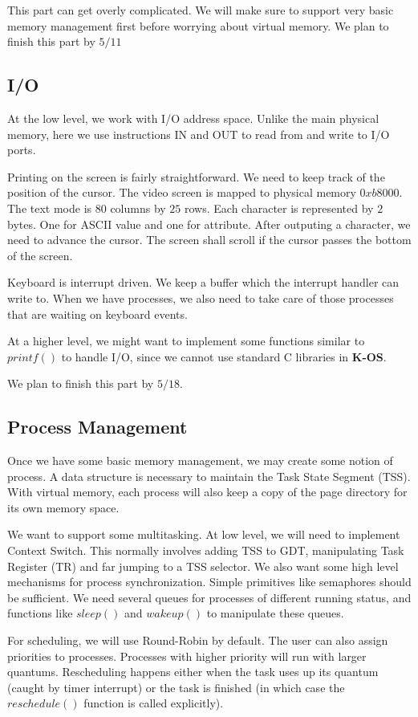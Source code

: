 \documentclass[dvips,11pt]{article}
\begin{document}
This part can get overly complicated. We will make sure to support
very basic memory management first before worrying about virtual
memory. We plan to finish this part by $5/11$


\subsection{\textbf{I/O}}
At the low level, we work with I/O address space. Unlike the main
physical memory, here we use instructions IN and OUT to read from and
write to I/O ports. 

Printing on the screen is fairly straightforward. We need to keep track of
the position of the cursor. The video screen is mapped to physical
memory $0xb8000$. The text mode is $80$ columns by $25$ rows. Each
character is represented by $2$ bytes. One for ASCII value and one for
attribute. After outputing a character, we need to advance the
cursor. The screen shall scroll if the cursor passes the bottom of the
screen. 

Keyboard is interrupt driven. We keep a buffer which the interrupt
handler can write to. When we have processes, we also need to take
care of those processes that are waiting on keyboard events.

At a higher level, we might want to implement some functions similar
to $printf()$ to handle I/O, since we cannot use standard C libraries
in {\bf K-OS}.

We plan to finish this part by $5/18$.


\subsection{\textbf{Process Management}}
Once we have some basic memory management, we may create some notion
of process. A data structure is necessary to maintain the Task
State Segment (TSS). With virtual memory, each process will also keep
a copy of the page directory for its own memory space.

We want to support some multitasking. At low level, we will need to
implement Context Switch. This normally involves adding TSS to GDT,
manipulating Task Register (TR) and far jumping to a TSS selector. We
also want some high level mechanisms for process synchronization. 
Simple primitives like semaphores should be sufficient. We need
several queues for processes of different running status, and
functions like $sleep()$ and $wakeup()$ to manipulate these queues.

For scheduling, we will use Round-Robin by default. The user can also
assign priorities to processes. Processes with higher priority will
run with larger quantums. Rescheduling happens either when the task
uses up its quantum (caught by timer interrupt) or the task is
finished (in which case the $reschedule()$ function is called
explicitly). 
\end{document}
